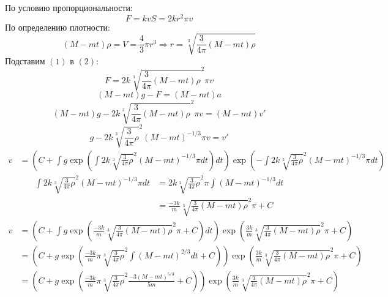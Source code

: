 По условию пропорциональности:
\begin{equation}
    F = kvS = 2kr^2\pi v
\end{equation}
По определению плотности:
\begin{equation}
    (M-mt)\rho = V = \frac{4}{3}\pi r^3 \Rightarrow r = \sqrt[3]{\frac{3}{4\pi} (M-mt)\rho}
\end{equation}
Подставим $(1)$ в $(2)$:
$$F = 2k \sqrt[3]{\frac{3}{4\pi} (M-mt)\rho}^2 \pi v$$
$$(M-mt)g - F = (M-mt)a$$
$$(M-mt)g - 2k \sqrt[3]{\frac{3}{4\pi} (M-mt)\rho}^2 \pi v = (M-mt) v'$$
$$g - 2k \sqrt[3]{\frac{3}{4\pi} \rho}^2 (M-mt)^{-1/3} \pi v = v'$$
\begin{align*}
    v & = \left( C + \int g\exp\left(\int 2k \sqrt[3]{\frac{3}{4\pi} \rho}^2 (M-mt)^{-1/3} \pi dt\right) dt \right) \exp\left(-\int 2k \sqrt[3]{\frac{3}{4\pi} \rho}^2 (M-mt)^{-1/3} \pi dt\right)
\end{align*}
\begin{align*}
    \int 2k \sqrt[3]{\frac{3}{4\pi} \rho}^2 (M-mt)^{-1/3} \pi dt & = 2k \sqrt[3]{\frac{3}{4\pi} \rho}^2 \pi \int (M-mt)^{-1/3} dt \\
                                                                 & = \frac{-3k}{m} \sqrt[3]{\frac{3}{4\pi} (M-mt) \rho}^2 \pi + C
\end{align*}
\begin{align*}
    v & = \left( C + \int g\exp\left( \frac{-3k}{m} \sqrt[3]{\frac{3}{4\pi} (M-mt) \rho}^2 \pi + C \right) dt \right) \exp\left(\frac{3k}{m} \sqrt[3]{\frac{3}{4\pi} (M-mt) \rho}^2 \pi + C\right)             \\
      & = \left( C + g \exp\left( \frac{-3k}{m} \pi \sqrt[3]{\frac{3}{4\pi} \rho}^2 \int (M-mt)^{2/3} dt + C \right) \right) \exp\left(\frac{3k}{m} \sqrt[3]{\frac{3}{4\pi} (M-mt) \rho}^2 \pi + C\right)      \\
      & = \left( C + g \exp\left( \frac{-3k}{m} \pi \sqrt[3]{\frac{3}{4\pi} \rho}^2 \frac{-3(M-mt)^{5/3}}{5m} + C \right) \right) \exp\left(\frac{3k}{m} \sqrt[3]{\frac{3}{4\pi} (M-mt) \rho}^2 \pi + C\right) \\
\end{align*}


